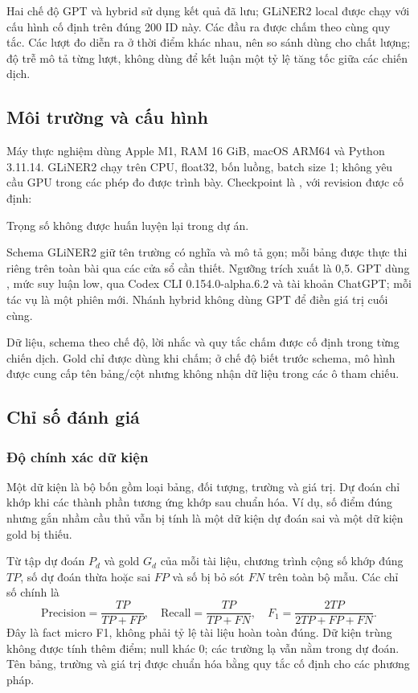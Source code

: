 Hai chế độ GPT và hybrid sử dụng kết quả đã lưu; GLiNER2 local được chạy với cấu hình cố định trên đúng 200 ID này. Các đầu ra được chấm theo cùng quy tắc. Các lượt đo diễn ra ở thời điểm khác nhau, nên so sánh dùng cho chất lượng; độ trễ mô tả từng lượt, không dùng để kết luận một tỷ lệ tăng tốc giữa các chiến dịch.

\subsection{Môi trường và cấu hình}
Máy thực nghiệm dùng Apple M1, RAM 16 GiB, macOS ARM64 và Python 3.11.14. GLiNER2 chạy trên CPU, float32, bốn luồng, batch size 1; không yêu cầu GPU trong các phép đo được trình bày. Checkpoint là , với revision được cố định:
\begin{center}\end{center}
 Trọng số không được huấn luyện lại trong dự án.

Schema GLiNER2 giữ tên trường có nghĩa và mô tả gọn; mỗi bảng được thực thi riêng trên toàn bài qua các cửa sổ cần thiết. Ngưỡng trích xuất là 0,5. GPT dùng , mức suy luận low, qua Codex CLI 0.154.0-alpha.6.2 và tài khoản ChatGPT; mỗi tác vụ là một phiên mới. Nhánh hybrid không dùng GPT để điền giá trị cuối cùng.

Dữ liệu, schema theo chế độ, lời nhắc và quy tắc chấm được cố định trong từng chiến dịch. Gold chỉ được dùng khi chấm; ở chế độ biết trước schema, mô hình được cung cấp tên bảng/cột nhưng không nhận dữ liệu trong các ô tham chiếu.

\subsection{Chỉ số đánh giá}
\subsubsection{Độ chính xác dữ kiện}
Một dữ kiện là bộ bốn gồm loại bảng, đối tượng, trường và giá trị. Dự đoán chỉ khớp khi các thành phần tương ứng khớp sau chuẩn hóa. Ví dụ, số điểm đúng nhưng gắn nhầm cầu thủ vẫn bị tính là một dữ kiện dự đoán sai và một dữ kiện gold bị thiếu.

Từ tập dự đoán $P_d$ và gold $G_d$ của mỗi tài liệu, chương trình cộng số khớp đúng $TP$, số dự đoán thừa hoặc sai $FP$ và số bị bỏ sót $FN$ trên toàn bộ mẫu. Các chỉ số chính là
\begin{equation}
\mathrm{Precision}=\frac{TP}{TP+FP},\quad
\mathrm{Recall}=\frac{TP}{TP+FN},\quad
F_1=\frac{2TP}{2TP+FP+FN}.
\end{equation}
Đây là fact micro F1, không phải tỷ lệ tài liệu hoàn toàn đúng. Dữ kiện trùng không được tính thêm điểm; null khác 0; các trường lạ vẫn nằm trong dự đoán. Tên bảng, trường và giá trị được chuẩn hóa bằng quy tắc cố định cho các phương pháp.

